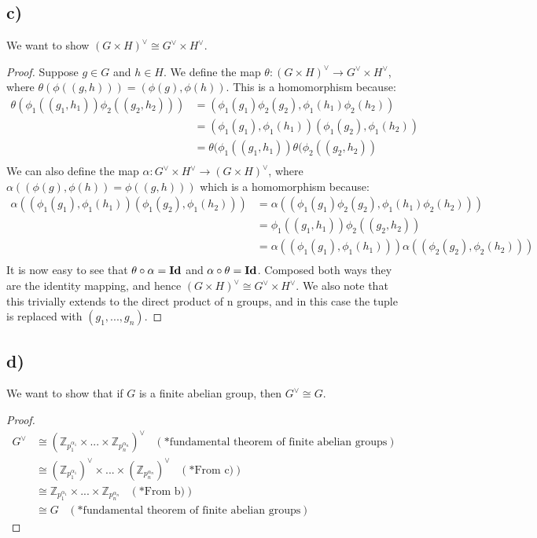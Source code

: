 \documentclass{article}
\begin{document}
\subsection*{c)}
We want to show $(G \times H)^\vee\cong G^\vee\times H^\vee$.
\begin{proof}
Suppose $g\in G$ and $h\in H$. We define the map $\theta:(G \times H)^\vee\rightarrow G^\vee\times H^\vee$, where $\theta(\phi((g,h)))=(\phi(g),\phi(h))$. This is a homomorphism because:
\begin{align*}
\theta(\phi_1((g_1,h_1))\phi_2((g_2,h_2)))&=(\phi_1(g_1)\phi_2(g_2),\phi_1(h_1)\phi_2(h_2))\\
&=(\phi_1(g_1),\phi_1(h_1))(\phi_1(g_2),\phi_1(h_2))\\
&=\theta(\phi_1((g_1,h_1))\theta(\phi_2((g_2,h_2))\\
\end{align*}
We can also define the map $\alpha:G^\vee\times H^\vee\rightarrow(G \times H)^\vee$, where $\alpha((\phi(g),\phi(h))=\phi((g,h)))$ which is a homomorphism because:
\begin{align*}
\alpha((\phi_1(g_1),\phi_1(h_1))(\phi_1(g_2),\phi_1(h_2)))&=\alpha((\phi_1(g_1)\phi_2(g_2),\phi_1(h_1)\phi_2(h_2)))\\
&=\phi_1((g_1,h_1))\phi_2((g_2,h_2))\\
&=\alpha((\phi_1(g_1),\phi_1(h_1)))\alpha((\phi_2(g_2),\phi_2(h_2)))\\
\end{align*}
It is now easy to see that $\theta\circ\alpha=\bold{Id}$ and $\alpha\circ\theta=\bold{Id}$. Composed both ways they are the identity mapping, and hence $(G \times H)^\vee\cong G^\vee\times H^\vee$. We also note that this trivially extends to the direct product of n groups, and in this case the tuple is replaced with $(g_1,...,g_n)$.
\end{proof}
\subsection*{d)}
We want to show that if $G$ is a finite abelian group, then $G^\vee\cong G$.
\begin{proof}
\begin{align*}
G^\vee&\cong(\mathbb{Z}_{p_1^{\alpha_1}}\times...\times\mathbb{Z}_{p_n^{\alpha_n}})^\vee\;\;\;(*\text{fundamental theorem of finite abelian groups})\\
&\cong(\mathbb{Z}_{p_1^{\alpha_1}})^\vee\times...\times(\mathbb{Z}_{p_n^{\alpha_n}})^\vee\;\;\;(*\text{From c)})\\
&\cong\mathbb{Z}_{p_1^{\alpha_1}}\times...\times\mathbb{Z}_{p_n^{\alpha_n}}\;\;\;(*\text{From b)})\\
&\cong G\;\;\;(*\text{fundamental theorem of finite abelian groups})
\end{align*}
\end{proof}
\end{document}
